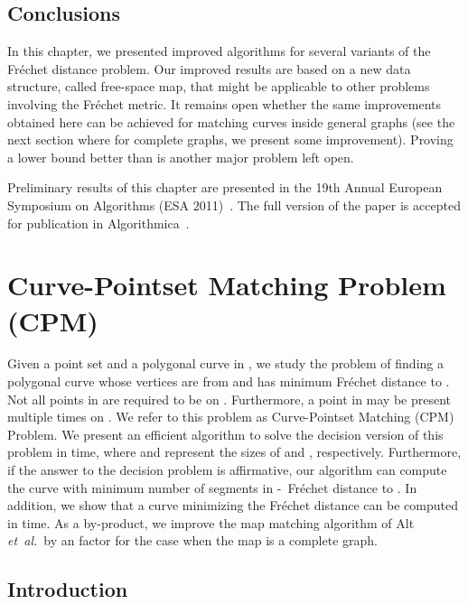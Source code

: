 \documentclass[12pt]{dalthesis}
\newcommand{\etal}{{\em et~al.\/}}
\newcommand{\Frechet}{Fr\'echet }
\newcommand{\fs}{free-space }
\begin{document}
\section{Conclusions} \label{sec:concl}

In this chapter, we presented improved algorithms
for several variants of the \Frechet distance problem.
Our improved results are based on a new data structure, called \fs map,
that might be applicable to other problems involving the \Frechet metric.
It remains open whether the same improvements obtained here
can be achieved for matching curves inside general graphs (see the next section where for 
complete graphs, we present some 
improvement).  
Proving a lower bound better than  
is another major problem left open.


Preliminary results of this chapter 
are presented in the 
19th Annual European Symposium on Algorithms (ESA 2011)~\cite{oursESA2011}.
The full version of the paper is accepted 
for publication in Algorithmica~\cite{oursPartialAlgorithmica}.


\clearpage{}

\clearpage{}\newcommand{\re}{\ell}


\chapter{Curve-Pointset Matching Problem (CPM) }
\label{ch:StayClose}

	Given a point set  and a polygonal curve  in ,
	we study the problem of finding a polygonal curve  whose vertices are from 
	and has minimum \Frechet distance to . 
	Not all points in  are required to be on 
	. Furthermore, a point in  may be present multiple times on  . 
	We refer to this problem as  
	Curve-Pointset Matching (CPM) Problem.
	We present an efficient algorithm to solve the decision version 
	of this problem in  time,
	where  and  represent the sizes of  and , respectively.
	Furthermore, if the answer to the decision problem is affirmative, 
	our algorithm can compute the curve with minimum number of segments 
	in -~\Frechet distance to .	
	In addition, we show that a curve minimizing the \Frechet distance can be computed in 
	 time.
	As a by-product, we improve the map matching algorithm of Alt \etal\ 
	by an  factor for the case when the map is a complete graph.




\section{Introduction}
\end{document}
